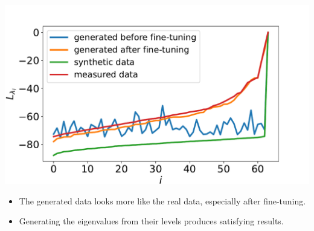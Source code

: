 \documentclass[12pt,pdftex,16x10]{elpres} %
\begin{document}
\begin{psli}
  \begin{minipage}[b][0.7\textheight][t]{0.5\textwidth}
    \centering
    \includegraphics[width=1.2\textwidth]{figs/samples_evals_dB_wgangp.pdf}
  \end{minipage}
  \begin{minipage}[b][0.7\textheight][t]{0.5\textwidth}
    \begin{itemize}
        \item The generated data looks more like the real data, especially after fine-tuning.
        \item Generating the eigenvalues from their levels produces satisfying results.
    \end{itemize}
  \end{minipage}
\end{psli}
\end{document}
